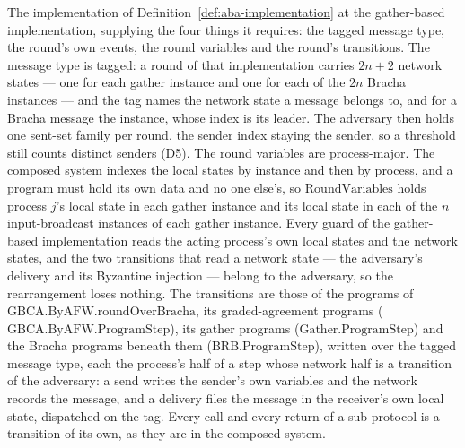 \begin{definition}
  \label{def:aba-afw-protocol}
  \leanok
  The implementation of Definition~\ref{def:aba-implementation} at the gather-based implementation, supplying the four things it requires: the tagged message type, the round's own events, the round variables and the round's transitions.
  The message type is tagged: a round of that implementation carries $2n+2$ network states --- one for each gather instance and one for each of the $2n$ Bracha instances --- and the tag names the network state a message belongs to, and for a Bracha message the instance, whose index is its leader.
  The adversary then holds one sent-set family per round, the sender index staying the sender, so a threshold still counts distinct senders (D5).
  The round variables are process-major.
  The composed system indexes the local states by instance and then by process, and a program must hold its own data and no one else's, so $\mathrm{RoundVariables}$ holds process $j$'s local state in each gather instance and its local state in each of the $n$ input-broadcast instances of each gather instance.
  Every guard of the gather-based implementation reads the acting process's own local states and the network states, and the two transitions that read a network state --- the adversary's delivery and its Byzantine injection --- belong to the adversary, so the rearrangement loses nothing.
  The transitions are those of the programs of $\mathrm{GBCA.ByAFW.roundOverBracha}$, its graded-agreement programs ($\mathrm{GBCA.ByAFW.ProgramStep}$), its gather programs ($\mathrm{Gather.ProgramStep}$) and the Bracha programs beneath them ($\mathrm{BRB.ProgramStep}$), written over the tagged message type, each the process's half of a step whose network half is a transition of the adversary: a send writes the sender's own variables and the network records the message, and a delivery files the message in the receiver's own local state, dispatched on the tag.
  Every call and every return of a sub-protocol is a transition of its own, as they are in the composed system.

\end{definition}
